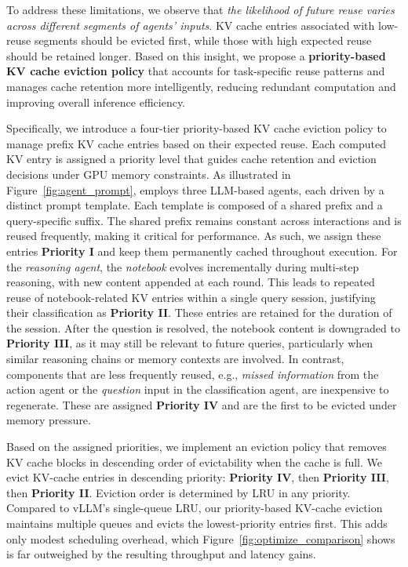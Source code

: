 To address these limitations, we observe that \textit{the likelihood of future reuse varies across different segments of agents’ inputs}. KV cache entries associated with low-reuse segments should be evicted first, while those with high expected reuse should be retained longer. Based on this insight, we propose a \textbf{priority-based KV cache eviction policy} that accounts for task-specific reuse patterns and manages cache retention more intelligently, reducing redundant computation and improving overall inference efficiency.

Specifically, we introduce a four-tier priority-based KV cache eviction policy to manage prefix KV cache entries based on their expected reuse. Each computed KV entry is assigned a priority level that guides cache retention and eviction decisions under GPU memory constraints. As illustrated in Figure~\ref{fig:agent_prompt}, \projectname employs three LLM-based agents, each driven by a distinct prompt template. Each template is composed of a shared prefix and a query-specific suffix. The shared prefix remains constant across interactions and is reused frequently, making it critical for performance. As such, we assign these entries \textbf{Priority I} and keep them permanently cached throughout execution. For the \textit{reasoning agent}, the \textit{notebook} evolves incrementally during multi-step reasoning, with new content appended at each round. This leads to repeated reuse of notebook-related KV entries within a single query session, justifying their classification as \textbf{Priority II}. These entries are retained for the duration of the session. After the question is resolved, the notebook content is downgraded to \textbf{Priority III}, as it may still be relevant to future queries, particularly when similar reasoning chains or memory contexts are involved. In contrast, components that are less frequently reused, e.g., \textit{missed information} from the action agent or the \textit{question} input in the classification agent, are inexpensive to regenerate. These are assigned \textbf{Priority IV} and are the first to be evicted under memory pressure.

Based on the assigned priorities, we implement an eviction policy that removes KV cache blocks in descending order of evictability when the cache is full. 
We evict KV-cache entries in descending priority: \textbf{Priority IV}, then \textbf{Priority III}, then \textbf{Priority II}. Eviction order is determined by LRU in any priority.
Compared to vLLM’s single-queue LRU, our priority-based KV-cache eviction maintains multiple queues and evicts the lowest-priority entries first. This adds only modest scheduling overhead, which Figure~\ref{fig:optimize_comparison} shows is far outweighed by the resulting throughput and latency gains.



